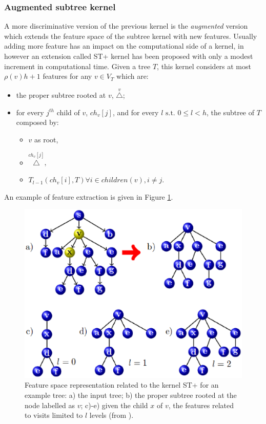 \subsubsection{Augmented subtree kernel}
A more discriminative version of the previous kernel is the \emph{augmented} version
which extends the feature space of the subtree kernel with new features.
Usually adding more feature has an impact on the computational side of a kernel,
in \cite{dasanmartino2015exploiting} however an extension called ST+ kernel has been proposed with
only a modest increment in computational time.
Given a tree $T$, this kernel considers at most $\rho(v)h + 1$ features for any
$v \in V_T$ which are:
\begin{itemize}
    \item the proper subtree rooted at $v$, $\overset{v}{\triangle}$;
    \item for every $j^{th}$ child of $v$, $ch_v[j]$, and for every $l\text{ s.t. }0 \leq l < h$,
        the subtree of $T$ composed by:
        \begin{itemize}
            \item $v$ as root,
            \item $\overset{ch_v[j]}{\triangle}$,
            \item $T_{l-1}(ch_v[i],T) \forall i \in children(v), i \ne j$.
        \end{itemize}
\end{itemize}

An example of feature extraction is given in Figure \ref{fig:featext}.

\begin{figure}[ht]
    \centering
    \includegraphics[scale=0.4]{Figures/featext}
    \caption{Feature space representation related to the kernel ST+ for an example
    tree: a) the input tree; b) the proper subtree rooted at the node labelled as $v$;
    c)-e) given the child $x$ of $v$, the features related to visits limited to $l$ levels (from \cite{dasanmartino2015exploiting}).} 
    \label{fig:featext}
\end{figure}

